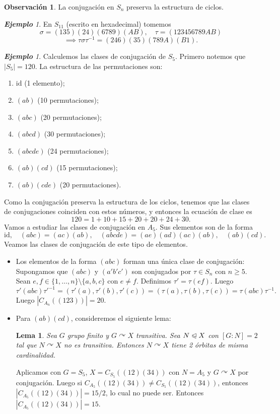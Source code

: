 \documentclass{article}
\newtheorem{lemma}[theorem]{Lema}
\theoremstyle{definition}
\newtheorem*{obs}{Observación}
\theoremstyle{remark}
\newtheorem{example}[theorem]{\textbf{Ejemplo}}
\numberwithin{equation}{section}
\newcommand{\acts}{\curvearrowright}
\newcommand{\normal}{\trianglelefteqslant}
\newcommand{\id}{\mathrm{id}}
\newcommand{\abs}[1]{\left| #1 \right|}
\begin{document}
\begin{obs}
  La conjugación en $S_n$ preserva la estructura de ciclos.
\end{obs}

\begin{example}
  En $S_{11}$ (escrito en hexadecimal) tomemos
  \[\sigma = (135)(24)(6789)(AB), \quad \tau = (123456789AB)\]
  \[\implies \tau\sigma\tau^{-1} = (246)(35)(789A)(B1).\]
\end{example}

\begin{example}
  Calculemos las clases de conjugación de $S_5$. Primero notemos que $\abs{S_5} = 120$. La estructura de las permutaciones son:
  \begin{enumerate}[(1)]
    \item $\id$ (1 elemento);
    \item $(ab)$ (10 permutaciones);
    \item $(abc)$ (20 permutaciones);
    \item $(abcd)$ (30 permutaciones);
    \item $(abcde)$ (24 permutaciones);
    \item $(ab)(cd)$ (15 permutaciones);
    \item $(ab)(cde)$ (20 permutaciones).
  \end{enumerate}
  Como la conjugación preserva la estructura de los ciclos, tenemos que las clases de conjugaciones coinciden con estos números, y entonces la ecuación de clase es
  \[120 = 1 + 10 + 15 + 20 + 20 + 24 + 30.\]
  Vamos a estudiar las clases de conjugación en $A_5$. Sus elementos son de la forma
  \[\id, \quad (abc) = (ac)(ab), \quad (abcde) = (ae)(ad)(ac)(ab), \quad (ab)(cd).\]
  Veamos las clases de conjugación de este tipo de elementos.
  \begin{itemize}
    \item Los elementos de la forma $(abc)$ forman una única clase de conjugación:
    Supongamos que $(abc)$ y $(a'b'c')$ son conjugados por $\tau \in S_n$ con $n \geq 5$. Sean $e,f \in \{1,\dots,n\} \setminus \{a,b,c\}$ con $e \neq f$. Definimos $\tau' = \tau(ef)$. Luego
    \[\tau'(abc)\tau'^{-1} = (\tau'(a), \tau'(b), \tau'(c))
    = (\tau(a),\tau(b),\tau(c)) = \tau(abc)\tau^{-1}.\]
    Luego $\abs{C_{A_n}((123))} = 20$.

    \item Para $(ab)(cd)$, consideremos el siguiente lema:
    \begin{lemma}
      Sea $G$ grupo finito y $G \acts X$ transitiva. Sea $N \normal X$ con $[G : N] = 2$ tal que $N \acts X$ no es transitiva.
      Entonces $N \acts X$ tiene 2 órbitas de misma cardinalidad.
    \end{lemma}
    Aplicamos con $G = S_5$, $X = C_{S_5}((12)(34))$ con $N = A_5$ y $G \acts X$ por conjugación.
    Luego si $C_{A_5}((12)(34)) \neq C_{S_5}((12)(34))$, entonces $\abs{C_{A_5}((12)(34))} = 15/2$, lo cual no puede ser. Entonces $\abs{C_{A_5}((12)(34))} = 15$.


\end{itemize}
\end{example}
\end{document}
